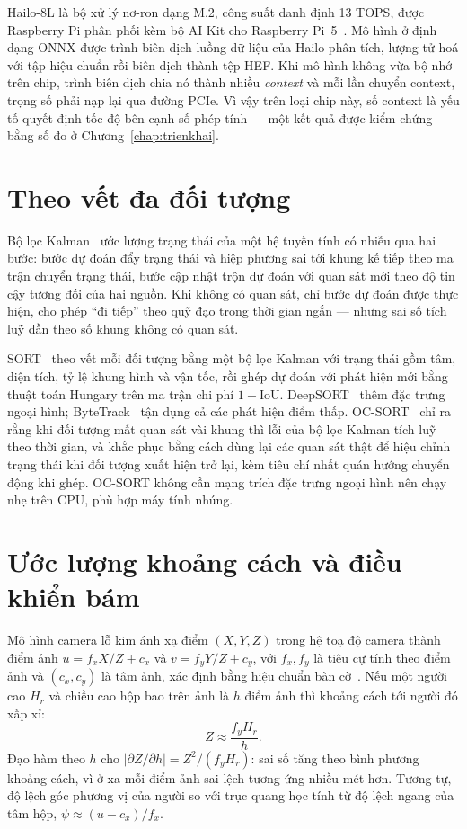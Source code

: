 Hailo-8L là bộ xử lý nơ-ron dạng M.2, công suất danh định 13 TOPS, được Raspberry Pi phân phối kèm bộ AI Kit cho Raspberry Pi~5~\cite{rpi_aikit}. Mô hình ở định dạng ONNX được trình biên dịch luồng dữ liệu của Hailo phân tích, lượng tử hoá với tập hiệu chuẩn rồi biên dịch thành tệp HEF. Khi mô hình không vừa bộ nhớ trên chip, trình biên dịch chia nó thành nhiều \textit{context} và mỗi lần chuyển context, trọng số phải nạp lại qua đường PCIe. Vì vậy trên loại chip này, số context là yếu tố quyết định tốc độ bên cạnh số phép tính --- một kết quả được kiểm chứng bằng số đo ở Chương~\ref{chap:trienkhai}.

\section{Theo vết đa đối tượng}

Bộ lọc Kalman~\cite{kalman1960} ước lượng trạng thái của một hệ tuyến tính có nhiễu qua hai bước: bước dự đoán đẩy trạng thái và hiệp phương sai tới khung kế tiếp theo ma trận chuyển trạng thái, bước cập nhật trộn dự đoán với quan sát mới theo độ tin cậy tương đối của hai nguồn. Khi không có quan sát, chỉ bước dự đoán được thực hiện, cho phép ``đi tiếp'' theo quỹ đạo trong thời gian ngắn --- nhưng sai số tích luỹ dần theo số khung không có quan sát.

SORT~\cite{bewley2016sort} theo vết mỗi đối tượng bằng một bộ lọc Kalman với trạng thái gồm tâm, diện tích, tỷ lệ khung hình và vận tốc, rồi ghép dự đoán với phát hiện mới bằng thuật toán Hungary trên ma trận chi phí $1-\mathrm{IoU}$. DeepSORT~\cite{wojke2017deepsort} thêm đặc trưng ngoại hình; ByteTrack~\cite{zhang2022bytetrack} tận dụng cả các phát hiện điểm thấp. OC-SORT~\cite{cao2023ocsort} chỉ ra rằng khi đối tượng mất quan sát vài khung thì lỗi của bộ lọc Kalman tích luỹ theo thời gian, và khắc phục bằng cách dùng lại các quan sát thật để hiệu chỉnh trạng thái khi đối tượng xuất hiện trở lại, kèm tiêu chí nhất quán hướng chuyển động khi ghép. OC-SORT không cần mạng trích đặc trưng ngoại hình nên chạy nhẹ trên CPU, phù hợp máy tính nhúng.

\section{Ước lượng khoảng cách và điều khiển bám}

Mô hình camera lỗ kim ánh xạ điểm $(X, Y, Z)$ trong hệ toạ độ camera thành điểm ảnh $u = f_x X/Z + c_x$ và $v = f_y Y/Z + c_y$, với $f_x, f_y$ là tiêu cự tính theo điểm ảnh và $(c_x, c_y)$ là tâm ảnh, xác định bằng hiệu chuẩn bàn cờ~\cite{zhang2000calibration}. Nếu một người cao $H_r$ và chiều cao hộp bao trên ảnh là $h$ điểm ảnh thì khoảng cách tới người đó xấp xỉ:
\begin{equation}
Z \approx \frac{f_y H_r}{h}.
\label{eq:distance}
\end{equation}
Đạo hàm theo $h$ cho $|\partial Z/\partial h| = Z^2/(f_y H_r)$: sai số tăng theo bình phương khoảng cách, vì ở xa mỗi điểm ảnh sai lệch tương ứng nhiều mét hơn. Tương tự, độ lệch góc phương vị của người so với trục quang học tính từ độ lệch ngang của tâm hộp, $\psi \approx (u - c_x)/f_x$.


